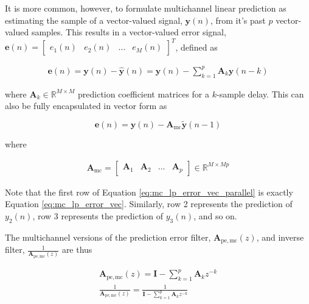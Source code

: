 It is more common, however, to formulate multichannel linear prediction as estimating the sample of a vector-valued signal, $\boldsymbol{y}(n)$, from it's past $p$ vector-valued samples. This results in a vector-valued error signal, $\boldsymbol{e}(n) = \begin{bmatrix} e_1(n) & e_2(n) & \dots& e_M(n) \end{bmatrix}^T$, defined as

\begin{eqnarray}
	\boldsymbol{e}(n) = \boldsymbol{y}(n) - \boldsymbol{\hat{y}}(n) = \boldsymbol{y}(n) - \sum_{k=1}^{p} \boldsymbol{A}_k \boldsymbol{y}(n-k)  \label{eq:mc_lp_error_parallel}
\end{eqnarray}

\noindent
where $\boldsymbol{A}_k \in  \mathbb{R} ^ {M\times M}$ prediction coefficient matrices for a $k$-sample delay. This can also be fully encapsulated in vector form as

\begin{equation}
	\boldsymbol{e}(n)= \boldsymbol{y}(n) - \boldsymbol{A}_{\mathrm{mc}} \tilde{\boldsymbol{y}}(n-1) \label{eq:mc_lp_error_vec_parallel}
\end{equation}

\noindent
where

\begin{eqnarray}
	\boldsymbol{A}_{\mathrm{mc}} = \begin{bmatrix}
		\boldsymbol{A}_1 & \boldsymbol{A}_2 & \dots& \boldsymbol{A}_p
	\end{bmatrix} \in \mathbb{R}^{M \times Mp}
\end{eqnarray}

\noindent
Note that the first row of Equation \ref{eq:mc_lp_error_vec_parallel} is exactly Equation \ref{eq:mc_lp_error_vec}. Similarly, row 2 represents the prediction of $y_2(n)$, row 3 represents the prediction of $y_3(n)$, and so on.

The multichannel versions of the prediction error filter, $\boldsymbol{A}_{\mathrm{pe,mc}}(z)$, and inverse filter, $\frac{1}{\boldsymbol{A}_{\mathrm{pe,mc}}(z)}$ are thus

\begin{eqnarray}
	\boldsymbol{A}_{\mathrm{pe,mc}}(z) = \boldsymbol{I} - \sum_{k=1}^{p} \boldsymbol{A}_k z^{-k} \label{eq:mc_pe_filter} \\
	\frac{1}{\boldsymbol{A}_{\mathrm{pe,mc}}(z)} = \frac{1}{\boldsymbol{I} - \sum_{k=1}^{p} \boldsymbol{A}_k z^{-k}}
\end{eqnarray}

